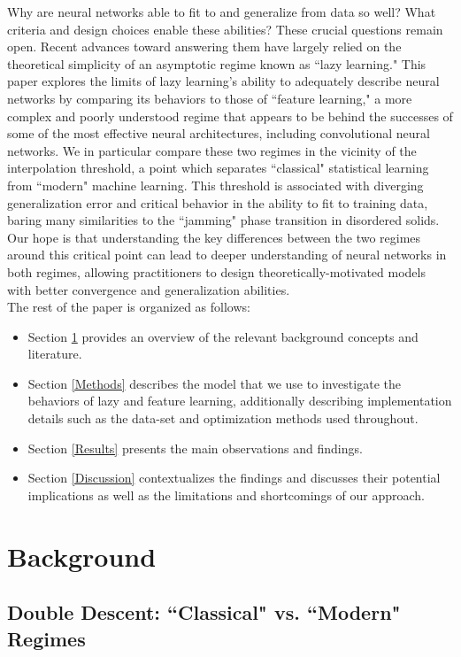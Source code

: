 \documentclass[11pt]{article}
\begin{document}
Why are neural networks able to fit to and generalize from data so well? What criteria and design choices enable these abilities? These crucial questions remain open. Recent advances toward answering them have largely relied on the theoretical simplicity of an asymptotic regime known as ``lazy learning." This paper explores the limits of lazy learning's ability to adequately describe neural networks by comparing its behaviors to those of ``feature learning," a more complex and poorly understood regime that appears to be behind the successes of some of the most effective neural architectures, including convolutional neural networks. We in particular compare these two regimes in the vicinity of the interpolation threshold, a point which separates ``classical" statistical learning from ``modern" machine learning. This threshold is associated with diverging generalization error and critical behavior in the ability to fit to training data, baring many similarities to the ``jamming" phase transition in disordered solids. Our hope is that understanding the key differences between the two regimes around this critical point can lead to deeper understanding of neural networks in both regimes, allowing practitioners to design theoretically-motivated models with better convergence and generalization abilities.\\

The rest of the paper is organized as follows:
\begin{itemize}
    \item Section \ref{Background} provides an overview of the relevant background concepts and literature.
    \item Section \ref{Methods} describes the model that we use to investigate the behaviors of lazy and feature learning, additionally describing implementation details such as the data-set and optimization methods used throughout.
    \item Section \ref{Results} presents the main observations and findings.
    \item Section \ref{Discussion} contextualizes the findings and discusses their potential implications as well as the limitations and shortcomings of our approach.
\end{itemize}

\section{Background}
\label{Background}

\subsection{Double Descent: ``Classical" vs. ``Modern" Regimes}
\end{document}
